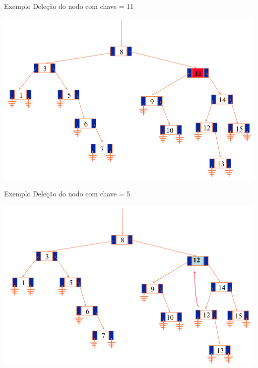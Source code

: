 \documentclass[12pt,table,xcolor={dvipsnames}]{beamer}
\begin{document}
\begin{frame}[fragile]{Exemplo}
Deleção do nodo com chave = 11
\begin{center}
\includegraphics[scale=.3]{arv13.png} 
\end{center}
\end{frame}

\begin{frame}[fragile]{Exemplo}
Deleção do nodo com chave = 5
\begin{center}
\includegraphics[scale=.3]{arv14.png} 
\end{center}
\end{frame}
\end{document}
